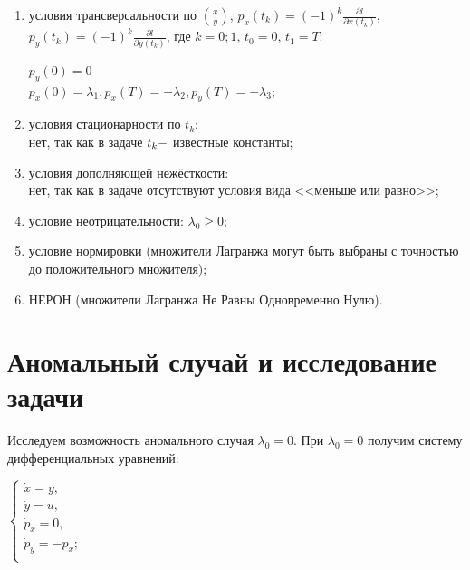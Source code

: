 \documentclass[a4paper,12pt,oneside]{article}
\numberwithin{equation}{section}
\numberwithin{table}{section}
\numberwithin{figure}{section}
\begin{document}
\begin{enumerate}
    \item условия трансверсальности по $\binom{x}{y}$, $p_x(t_k) = (-1)^k\frac{\partial l}{\partial x(t_k)}$, $p_y(t_k) = (-1)^k\frac{\partial l}{\partial y(t_k)}$, где $k = {0; 1}$, $t_0=0$, $t_1=T$: \\
    \begin{center}
     $
        p_y(0) = 0 
    $ \\
    $
        p_x(0) = \lambda_1, p_x(T) = -\lambda_2, p_y(T) = -\lambda_3;
    $
    \end{center}
    
    \item условия стационарности по $t_k$: \\
    нет, так как в задаче $t_k \--$ известные константы; \\
    
    \item условия дополняющей нежёсткости: \\
    нет, так как в задаче отсутствуют условия вида <<меньше или равно>>;
    
    \item условие неотрицательности: $\lambda_0 \geq 0$;
    
    \item условие нормировки (множители Лагранжа могут быть выбраны с точностью до положительного множителя);
    
    \item НЕРОН (множители Лагранжа Не Равны Одновременно Нулю).

\end{enumerate}

\section{Аномальный случай и исследование задачи}
Исследуем возможность аномального случая $\lambda_0 = 0$. При $\lambda_0 = 0$ получим систему дифференциальных уравнений:
    \begin{center}
        $
        \begin{cases}
            \dot{x} = y ,\\
            \dot{y} = u ,\\
            \dot{p}_x = 0,\\
            \dot{p}_y = - p_x;\\
        \end{cases}
        $
    \end{center}
    
\end{document}
